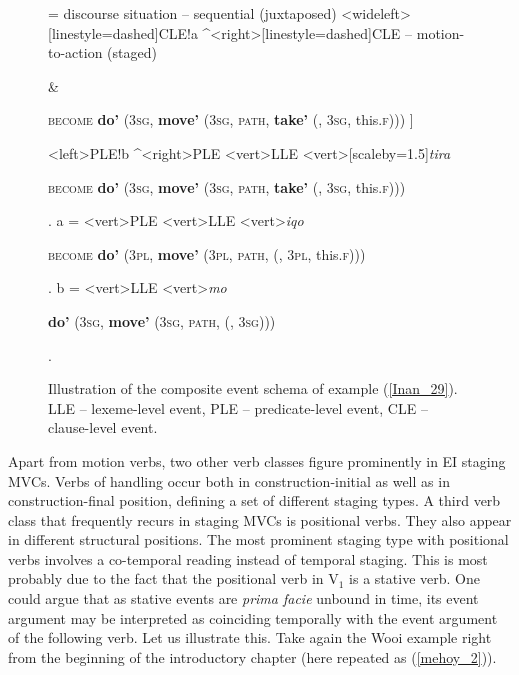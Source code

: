 \begin{figure}
\jtree[xunit=7.5em,yunit=2em]
\! = {discourse situation -- sequential (juxtaposed)}
<wideleft>[linestyle=dashed]{CLE}!a ^<right>[linestyle=dashed]{CLE -- motion-to-action (staged)}{\begin{scriptsize} [ \textbf{do'} (3\textsc{sg}, \textbf{move'} (3\textsc{sg}, \textsc{path}, \textbf{\rnode{D1}{come'}} (\rnode{B1}{e$_2$}, 3\textsc{sg})))\end{scriptsize} \&}
{\begin{scriptsize} \textsc{become} \textbf{do'} (3\textsc{sg}, \textbf{move'} (3\textsc{sg}, \textsc{path}, \textbf{take'} (, 3\textsc{sg}, this.\textsc{f}))) ]\end{scriptsize}}
<left>{PLE}!b ^<right>{PLE}
<vert>{LLE}
<vert>[scaleby=1.5]{\textit{tira}}{\begin{scriptsize} \textsc{become} \textbf{do'} (3\textsc{sg}, \textbf{move'} (3\textsc{sg}, \textsc{path}, \textbf{take'} (, 3\textsc{sg}, this.\textsc{f})))\end{scriptsize}}.
\!a = <vert>{PLE}
<vert>{LLE}
<vert>{\textit{iqo}}
{\begin{scriptsize} \textsc{become} \textbf{do'} (3\textsc{pl}, \textbf{move'} (3\textsc{pl}, \textsc{path}, \textbf{} (, 3\textsc{pl}, this.\textsc{f})))\end{scriptsize}}.
\!b = <vert>{LLE}
<vert>{\textit{mo}}
{\begin{scriptsize} \textbf{do'} (3\textsc{sg}, \textbf{move'} (3\textsc{sg}, \textsc{path}, \textbf{} (, 3\textsc{sg})))\end{scriptsize}}.
\endjtree

\caption[Event schema illustration of example (\ref{Inan_29})]{Illustration of the composite event schema of example (\ref{Inan_29}). LLE -- lexeme-level event, PLE -- predicate-level event, CLE -- clause-level event.}
\label{figure:eventschema_Inan29}
\end{figure}

Apart from motion verbs, two other verb classes figure prominently in EI staging MVCs. Verbs of handling occur both in construction-initial as well as in construction-final position, defining a set of different staging types. A third verb class that frequently recurs in staging MVCs is positional verbs. They also appear in different structural positions. The most prominent staging type with positional verbs involves a co-temporal reading instead of temporal staging. This is most probably due to the fact that the positional verb in V$_1$ is a stative verb. One could argue that as stative events are \textit{prima facie} unbound in time, its event argument may be interpreted as coinciding temporally with the event argument of the following verb. Let us illustrate this. Take again the Wooi example right from the beginning of the introductory chapter (here repeated as (\ref{mehoy_2})).


